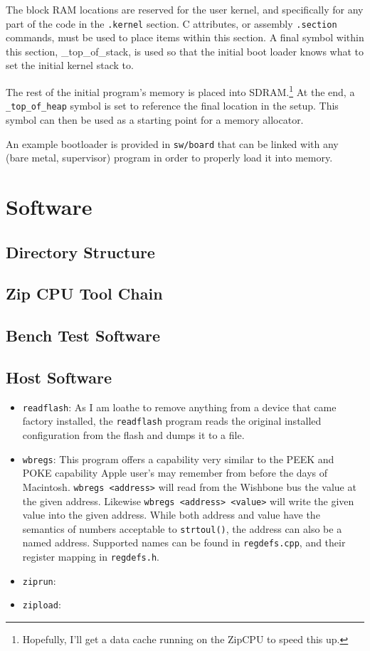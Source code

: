 \documentclass{gqtekspec}
\begin{document}
The block RAM locations are reserved for the user kernel, and specifically for
any part of the code in the {\tt .kernel} section.  C attributes, or assembly
{\tt .section} commands, must be used to place items within this section.
A final symbol within this section, {\_top\_of\_stack}, is used so that the
initial boot loader knows what to set the initial kernel stack to.

The rest of the initial program's memory is placed into
SDRAM.\footnote{Hopefully,
I'll get a data cache running on the ZipCPU to speed this up.}  At the end,
a {\tt \_top\_of\_heap} symbol is set to reference the final location in the
setup.  This symbol can then be used as a starting point for a memory allocator.

An example bootloader is provided in {\tt sw/board} that can be linked with
any (bare metal, supervisor) program in order to properly load it into memory.

\chapter{Software}
\section{Directory Structure}
\section{Zip CPU Tool Chain}
\section{Bench Test Software}
\section{Host Software}
\begin{itemize}
\item {\tt readflash}: As I am loathe to remove anything from
	a device that came factory installed, the
	{\tt readflash} program reads the original installed
	configuration from the flash and dumps it to a file.

\item {\tt wbregs}: This program offers a capability very similar to the 
	PEEK and POKE capability Apple user's may remember from before the
	days of Macintosh.  {\tt wbregs <address>} will read from the
	Wishbone bus the value at the given address.  Likewise
	{\tt wbregs <address> <value>} will write the given value into the
	given address.  While both address and value have the semantics of
	numbers acceptable to {\tt strtoul()}, the address can also be a named
	address.  Supported names can be found in {\tt regdefs.cpp}, and their
	register mapping in {\tt regdefs.h}.
\item {\tt ziprun}:
\item {\tt zipload}:
\end{itemize}
\end{document}
